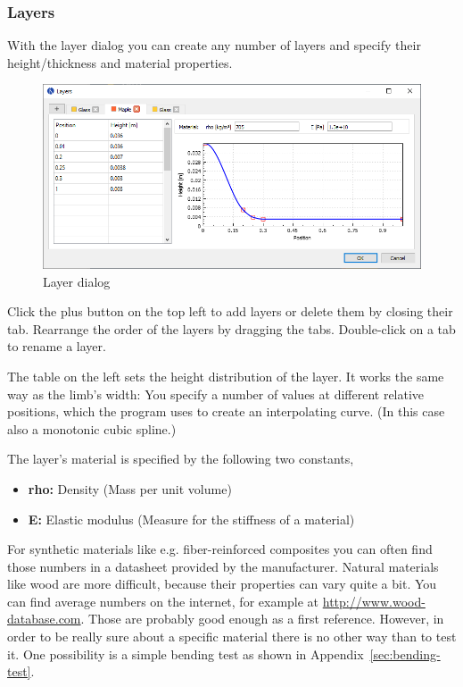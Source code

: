 \documentclass[12pt]{article}
\begin{document}
\newpage
\subsubsection{Layers}

With the layer dialog you can create any number of layers and specify their height/thickness and material properties.
\bigskip

\begin{figure}[H]
\centering
\includegraphics[width=\textwidth]{figures/screenshots/input/layers}
\caption{Layer dialog}
\label{fig:width}
\end{figure}

Click the plus button on the top left to add layers or delete them by closing their tab.
Rearrange the order of the layers by dragging the tabs.
Double-click on a tab to rename a layer.

The table on the left sets the height distribution of the layer. It works the same way as the limb's width: You specify a number of values at different relative positions, which the program uses to create an interpolating curve. (In this case also a monotonic cubic spline.)

The layer's material is specified by the following two constants,

\begin{itemize}
\item \textbf{rho:} Density (Mass per unit volume)
\item \textbf{E:} Elastic modulus (Measure for the stiffness of a material)
\end{itemize}

For synthetic materials like e.g. fiber-reinforced composites you can often find those numbers in a datasheet provided by the manufacturer.
Natural materials like wood are more difficult, because their properties can vary quite a bit.
You can find average numbers on the internet, for example at \url{http://www.wood-database.com}.
Those are probably good enough as a first reference.
However, in order to be really sure about a specific material there is no other way than to test it.
One possibility is a simple bending test as shown in Appendix~\ref{sec:bending-test}.
\end{document}
